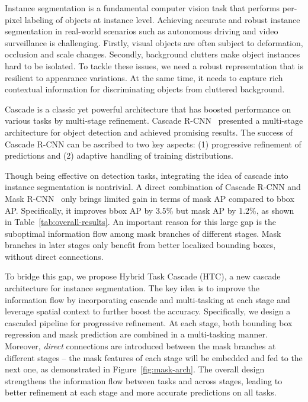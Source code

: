 \documentclass[10pt,twocolumn,letterpaper]{article}
\begin{document}
Instance segmentation is a fundamental computer vision task that performs
per-pixel labeling of objects at instance level. Achieving accurate and robust
instance segmentation in real-world scenarios such as autonomous driving and
video surveillance is challenging.
Firstly, visual objects are often subject to deformation, occlusion and scale
changes. Secondly, background clutters make object instances hard to be
isolated. To tackle these issues, we need a robust representation that is
resilient to appearance variations. At the same time, it needs to capture rich
contextual information for discriminating objects from cluttered background.

Cascade is a classic yet powerful architecture that has boosted performance on
various tasks by multi-stage refinement. Cascade R-CNN~\cite{cai18cascadercnn}
presented a multi-stage architecture for object detection and achieved promising
results. The success of Cascade R-CNN can be ascribed to two key aspects:
(1) progressive refinement of predictions and
(2) adaptive handling of training distributions.

Though being effective on detection tasks, integrating the idea of cascade into
instance segmentation is nontrivial. A direct combination of Cascade R-CNN and
Mask R-CNN~\cite{he2017mask} only brings limited gain in terms of mask AP
compared to bbox AP. Specifically, it improves bbox AP by $3.5\%$ but mask AP by
$1.2\%$, as shown in Table~\ref{tab:overall-results}. An important reason for
this large gap is the suboptimal information flow among mask branches of
different stages. Mask branches in later stages only benefit from better
localized bounding boxes, without direct connections.

To bridge this gap, we propose Hybrid Task Cascade (HTC),
a new cascade architecture for instance segmentation.
The key idea is to improve the information flow by incorporating cascade and
multi-tasking at each stage and leverage spatial context to further boost the
accuracy.
Specifically, we design a cascaded pipeline for progressive refinement.
At each stage, both bounding box regression and mask prediction
are combined in a multi-tasking manner.
Moreover, \emph{direct} connections are introduced between the mask branches
at different stages -- the mask features of each stage will be embedded and
fed to the next one, as demonstrated in Figure~\ref{fig:mask-arch}.
The overall design strengthens the information flow between tasks and
across stages, leading to better refinement at each stage and more accurate
predictions on all tasks.
\end{document}
